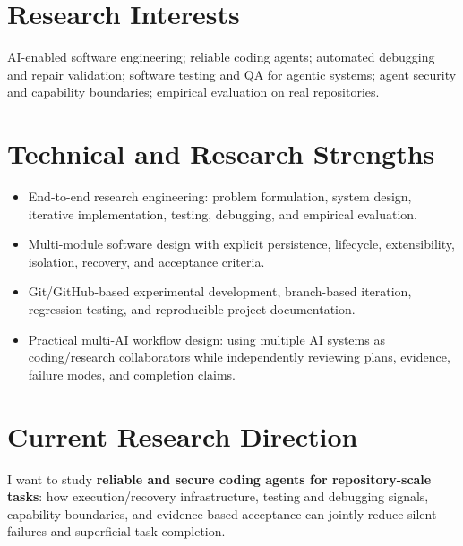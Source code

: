 \documentclass[10pt,a4paper]{article}
\begin{document}
\section{Research Interests}
AI-enabled software engineering; reliable coding agents; automated debugging and repair validation; software testing and QA for agentic systems; agent security and capability boundaries; empirical evaluation on real repositories.

\section{Technical and Research Strengths}
\begin{itemize}
  \item End-to-end research engineering: problem formulation, system design, iterative implementation, testing, debugging, and empirical evaluation.
  \item Multi-module software design with explicit persistence, lifecycle, extensibility, isolation, recovery, and acceptance criteria.
  \item Git/GitHub-based experimental development, branch-based iteration, regression testing, and reproducible project documentation.
  \item Practical multi-AI workflow design: using multiple AI systems as coding/research collaborators while independently reviewing plans, evidence, failure modes, and completion claims.
\end{itemize}

\section{Current Research Direction}
I want to study \textbf{reliable and secure coding agents for repository-scale tasks}: how execution/recovery infrastructure, testing and debugging signals, capability boundaries, and evidence-based acceptance can jointly reduce silent failures and superficial task completion.
\end{document}
